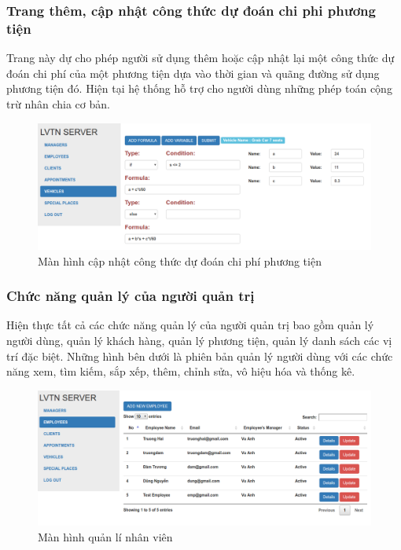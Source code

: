 \documentclass[a4paper]{article}
\begin{document}
\subsubsection{Trang thêm, cập nhật công thức dự đoán chi phi phương tiện}
Trang này dự cho phép người sử dụng thêm hoặc cập nhật lại một công thức dự đoán chi phí của một phương tiện dựa vào thời gian và quãng đường sử dụng phương tiện đó. Hiện
tại hệ thống hỗ trợ cho người dùng những phép toán cộng trừ nhân chia cơ bản.

\begin{figure}[H]
\centering
\includegraphics[scale=0.5]{admin/admin_chiphi}
\caption{Màn hình cập nhật công thức dự đoán chi phí phương tiện}
\end{figure}


\subsubsection{Chức năng quản lý của người quản trị}
Hiện thực tất cả các chức năng quản lý của người quản trị bao gồm quản lý người dùng, quản lý khách hàng, quản lý phương tiện, quản lý danh sách các vị trí đặc biệt.
Những hình bên dưới là phiên bản quản lý người dùng với các chức năng xem, tìm kiếm, sắp xếp, thêm, chỉnh sửa, vô hiệu hóa và thống kê.

\begin{figure}[H]
\centering
\includegraphics[scale=0.5]{admin/admin_employee}
\caption{Màn hình quản lí nhân viên}
\end{figure}
\end{document}
